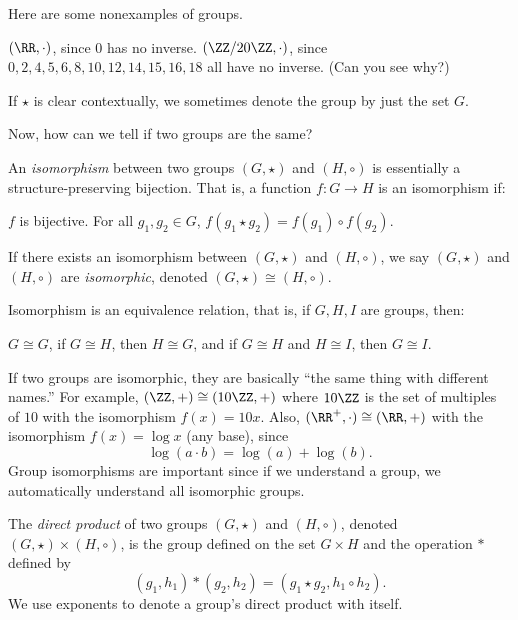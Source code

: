 \documentclass[11pt]{scrartcl}
\begin{document}
Here are some nonexamples of groups.
\begin{itemize}
	\ii $(\RR,\cdot)$, since $0$ has no inverse.
	\ii $(\ZZ/20\ZZ,\cdot)$, since $0,2,4,5,6,8,10,12,14,15,16,18$ all have no inverse. (Can you see why?)
\end{itemize}

\begin{remark*}
	If $\star$ is clear contextually, we sometimes denote the group by just the set $G$.
\end{remark*}

Now, how can we tell if two groups are the same?
\begin{definition}
	An \emph{isomorphism} between two groups $(G,\star)$ and $(H,\circ)$ is essentially a structure-preserving bijection. That is, a function $f: G \to H$ is an isomorphism if:
	\begin{itemize}
		\ii $f$ is bijective.
		\ii For all $g_1,g_2 \in G$, $f(g_1 \star g_2) = f(g_1) \circ f(g_2)$.
	\end{itemize}
	If there exists an isomorphism between $(G,\star)$ and $(H,\circ)$, we say $(G,\star)$ and $(H,\circ)$ are \emph{isomorphic}, denoted $(G,\star) \cong (H,\circ)$.
\end{definition}

\begin{remark*}
	Isomorphism is an equivalence relation, that is, if $G,H,I$ are groups, then:
	\begin{itemize}
		\ii $G \cong G$,
		\ii if $G \cong H$, then $H \cong G$,
		\ii and if $G \cong H$ and $H \cong I$, then $G \cong I$.
	\end{itemize}
\end{remark*}

If two groups are isomorphic, they are basically ``the same thing with different names.'' For example, $(\ZZ,+) \cong (10\ZZ,+)$ where $10\ZZ$ is the set of multiples of $10$ with the isomorphism $f(x) = 10x$. Also, $(\RR^+,\cdot) \cong (\RR,+)$ with the isomorphism $f(x) = \log x$ (any base), since
\[\log(a \cdot b) = \log(a) + \log(b).\]
Group isomorphisms are important since if we understand a group, we automatically understand all isomorphic groups.

\begin{definition}
	The \emph{direct product} of two groups $(G,\star)$ and $(H,\circ)$, denoted $(G,\star) \times (H,\circ)$, is the group defined on the set $G \times H$ and the operation $\ast$ defined by
	\[(g_1,h_1) \ast (g_2,h_2) = (g_1 \star g_2,h_1 \circ h_2).\]
	We use exponents to denote a group's direct product with itself.
\end{definition}
\end{document}
